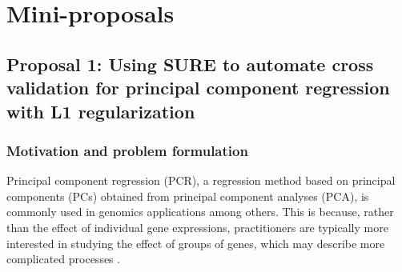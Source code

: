 

\section{Mini-proposals}

%

\subsection{Proposal 1: Using SURE to automate cross validation for principal component regression with L1 regularization} %
\subsubsection{Motivation and problem formulation}
Principal component regression (PCR), a regression method based on principal components (PCs) obtained from principal component analyses (PCA), is commonly used in genomics applications among others. This is because, rather than the effect of individual gene expressions, practitioners are typically more interested in studying the effect of groups of genes, which may describe more complicated processes \citep{ding2022sufficient}. 

